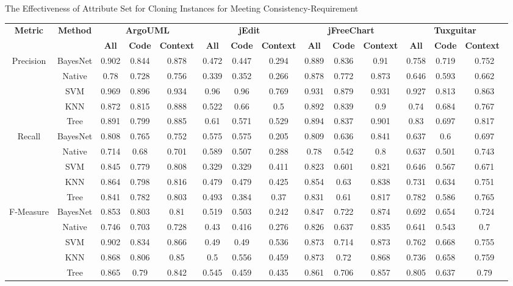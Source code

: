 \begin{table*}[htbp]
\scriptsize
{The Effectiveness of Attribute Set for Cloning Instances for Meeting Consistency-Requirement}
\vspace{0.5em}
\centering
\begin{tabular}{cccccccccccccc}
\toprule[1.5pt]
\multirow{2}{*}{\textbf{Metric}}&\multirow{2}{*}{\textbf{Method}}&\multicolumn{3}{c}{\textbf{ArgoUML}}&\multicolumn{3}{c}{\textbf{jEdit}}&\multicolumn{3}{c}{\textbf{jFreeChart}}&\multicolumn{3}{c}{\textbf{Tuxguitar}}\\
\cline{3-14}
&&\textbf{All}&\textbf{Code}&\textbf{Context}&\textbf{All}&\textbf{Code}&\textbf{Context}&\textbf{All}&\textbf{Code}&\textbf{Context}&\textbf{All}&\textbf{Code}&\textbf{Context}~\\
\midrule[1pt]
\multirow{5}{*}{Precision}
&BayesNet&	0.902	&0.844	&0.878	&	0.472	&0.447	&0.294	&	0.889	&0.836	&0.91	&	0.758	&0.719	&0.752\\
&Native&	0.78&	0.728&	0.756	&	0.339	&0.352	&0.266	&	0.878	&0.772	&0.873	&	0.646	&0.593	&0.662\\
&SVM&	0.969	&0.896	&0.934	&	0.96	&0.96&	0.769	&	0.931	&0.879	&0.931	&	0.927&	0.813	&0.863\\
&KNN&	0.872	&0.815	&0.888		&0.522	&0.66	&0.5		&0.892	&0.839	&0.9	&	0.74&	0.684	&0.767\\
&Tree&	0.891	&0.799&	0.885	&	0.61	&0.571	&0.529	&	0.894	&0.837&	0.901	&	0.83	&0.697	&0.817\\
\hline
\multirow{5}{*}{Recall}
&BayesNet&	0.808	&0.765&	0.752		&0.575	&0.575	&0.205	&	0.809&	0.636&	0.841	&	0.637&	0.6	&0.697\\
&Native&	0.714&	0.68	&0.701	&	0.589	&0.507&	0.288		&0.78	&0.542	&0.8	&	0.637	&0.501	&0.743\\
&SVM&	0.845&	0.779	&0.808	&	0.329	&0.329&	0.411	&	0.823	&0.601&	0.821	&	0.646	&0.567	&0.671\\
&KNN&	0.864&	0.798	&0.816	&	0.479	&0.479&	0.425	&	0.854&	0.63&	0.838		&0.731	&0.634&	0.751\\
&Tree&	0.841&	0.782	&0.803	&	0.493	&0.384&	0.37	&	0.831&	0.61&	0.817	&	0.782	&0.586	&0.765\\
\hline
\multirow{5}{*}{F-Measure}
&BayesNet&	0.853&	0.803&	0.81	&	0.519	&0.503&	0.242	&	0.847&	0.722&	0.874	&	0.692&	0.654&	0.724\\
&Native&	0.746&	0.703	&0.728		&0.43	&0.416	&0.276	&	0.826	&0.637	&0.835		&0.641	&0.543	&0.7\\
&SVM&	0.902&	0.834&	0.866&		0.49&	0.49	&0.536	&	0.873&	0.714	&0.873	&	0.762	&0.668&	0.755\\
&KNN&	0.868&	0.806&	0.85	&	0.5&	0.556	&0.459		&0.873	&0.72	&0.868		&0.736&	0.658	&0.759\\
&Tree&	0.865&	0.79&	0.842	&	0.545&	0.459&	0.435	&	0.861	&0.706&	0.857	&	0.805	&0.637&	0.79\\
\bottomrule[1.5pt]
\end{tabular}
\end{table*}

